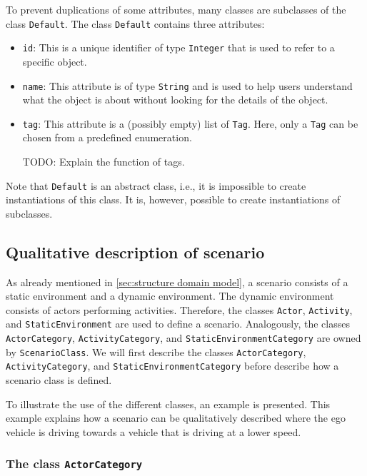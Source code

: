 \documentclass[10pt,final,a4paper,oneside,onecolumn]{article}
\theoremstyle{plain}\newtheorem{definition}{Definition}[section]    %
\theoremstyle{definition}\newtheorem{example}{Example}[section]     %
\theoremstyle{remark}\newtheorem{remarkenv}{Remark}[section]        %
\begin{document}
To prevent duplications of some attributes, many classes are subclasses of the class \texttt{Default}. The class \texttt{Default} contains three attributes:
\begin{itemize}
	\item \texttt{id}: This is a unique identifier of type \texttt{Integer} that is used to refer to a specific object.
	\item \texttt{name}: This attribute is of type \texttt{String} and is used to help users understand what the object is about without looking for the details of the object. 
	\item \texttt{tag}: This attribute is a (possibly empty) list of \texttt{Tag}. Here, only a \texttt{Tag} can be chosen from a predefined enumeration.
	
	\color{red}
	TODO: Explain the function of tags.
	\color{black}
\end{itemize}
Note that \texttt{Default} is an abstract class, i.e., it is impossible to create instantiations of this class. It is, however, possible to create instantiations of subclasses.

\subsection{Qualitative description of scenario}
\label{sec:qualitative scenario}

As already mentioned in \cref{sec:structure domain model}, a scenario consists of a static environment and a dynamic environment. The dynamic environment consists of actors performing activities. Therefore, the classes \texttt{Actor}, \texttt{Activity}, and \texttt{StaticEnvironment} are used to define a scenario. Analogously, the classes \texttt{ActorCategory}, \texttt{ActivityCategory}, and \texttt{StaticEnvironmentCategory} are owned by \texttt{ScenarioClass}. We will first describe the classes \texttt{ActorCategory}, \texttt{ActivityCategory}, and \texttt{StaticEnvironmentCategory} before describe how a scenario class is defined.

To illustrate the use of the different classes, an example is presented. This example explains how a scenario can be qualitatively described where the ego vehicle is driving towards a vehicle that is driving at a lower speed. 

\subsubsection{The class \texttt{ActorCategory}}
\label{sec:actor category}
\end{document}
